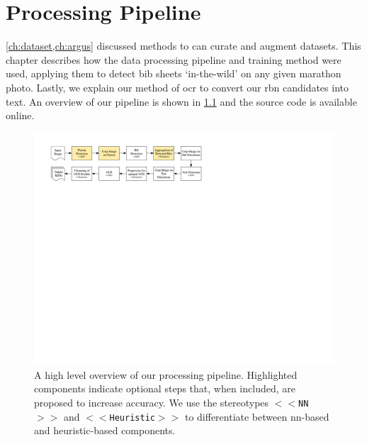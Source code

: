 \chapter{Processing Pipeline}
\label{ch:processing_pipeline}

\cref{ch:dataset,ch:argus} discussed methods to can curate and augment datasets. This chapter describes how the data processing pipeline and training method were used, applying them to detect bib sheets `in-the-wild' on any given marathon photo. Lastly, we explain our method of \gls{ocr} to convert our \gls{rbn} candidates into text.  An overview of our pipeline is shown in \cref{fig:processing_pipeline:pipeline} and the source code is available online.

\begin{figure}[h]
  \centering
  \includegraphics[width=\textwidth]{images/processing/pipeline}
  \caption[Overview of our processing pipeline]{A high level overview of our processing pipeline. Highlighted components indicate optional steps that, when included, are proposed to increase accuracy. We use the stereotypes \texttt{$<<$NN$>>$} and \texttt{$<<$Heuristic$>>$} to differentiate between \gls{nn}-based and heuristic-based components.}
  \label{fig:processing_pipeline:pipeline}
\end{figure}






